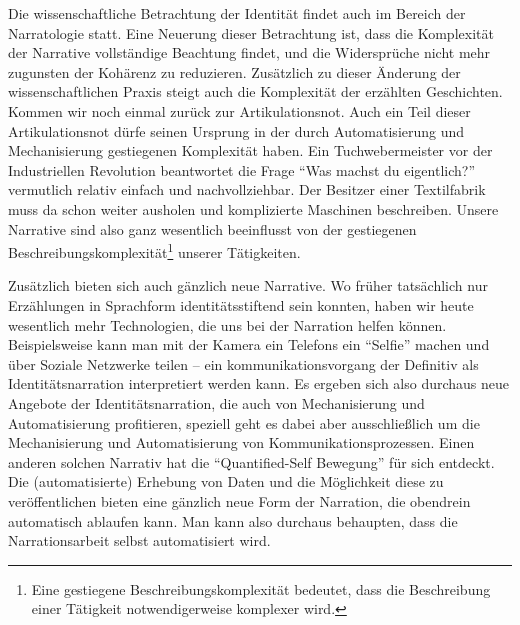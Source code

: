 Die wissenschaftliche Betrachtung der Identität findet auch im Bereich der Narratologie statt.
Eine Neuerung dieser Betrachtung ist, dass die Komplexität der Narrative vollständige Beachtung findet, und die Widersprüche nicht mehr zugunsten der Kohärenz zu reduzieren\parencite[164]{kraus}.
Zusätzlich zu dieser Änderung der wissenschaftlichen Praxis steigt auch die Komplexität der erzählten Geschichten.
Kommen wir noch einmal zurück zur Artikulationsnot. Auch ein Teil dieser Artikulationsnot dürfe seinen Ursprung in der durch Automatisierung und Mechanisierung gestiegenen Komplexität haben.
Ein Tuchwebermeister vor der Industriellen Revolution beantwortet die Frage \enquote{Was machst du eigentlich?} vermutlich relativ einfach und nachvollziehbar.
Der Besitzer einer Textilfabrik muss da schon weiter ausholen und komplizierte Maschinen beschreiben.
Unsere Narrative sind also ganz wesentlich beeinflusst von der gestiegenen Beschreibungskomplexität\footnote{Eine gestiegene Beschreibungskomplexität bedeutet, dass die Beschreibung einer Tätigkeit notwendigerweise komplexer wird.} unserer Tätigkeiten.

Zusätzlich bieten sich auch gänzlich neue Narrative.
Wo früher tatsächlich nur Erzählungen in Sprachform identitätsstiftend sein konnten, haben wir heute wesentlich mehr Technologien, die uns bei der Narration helfen können.
Beispielsweise kann man mit der Kamera ein Telefons ein \enquote{Selfie} machen und über Soziale Netzwerke teilen – ein kommunikationsvorgang der Definitiv als Identitätsnarration interpretiert werden kann\parencite{iqani}.
Es ergeben sich also durchaus neue Angebote der Identitätsnarration, die auch von Mechanisierung und Automatisierung profitieren, speziell geht es dabei aber ausschließlich um die Mechanisierung und Automatisierung von Kommunikationsprozessen.
Einen anderen solchen Narrativ hat die \enquote{Quantified-Self Bewegung} für sich entdeckt\parencite{bellinger}.
Die (automatisierte) Erhebung von Daten und die Möglichkeit diese zu veröffentlichen bieten eine gänzlich neue Form der Narration, die obendrein automatisch ablaufen kann.
Man kann also durchaus behaupten, dass die Narrationsarbeit selbst automatisiert wird.


